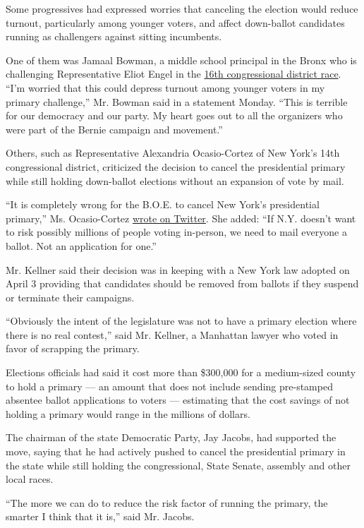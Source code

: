 Some progressives had expressed worries that canceling the election
would reduce turnout, particularly among younger voters, and affect
down-ballot candidates running as challengers against sitting
incumbents.

One of them was Jamaal Bowman, a middle school principal in the Bronx
who is challenging Representative Eliot Engel in the
\href{https://www.nytimes3xbfgragh.onion/2019/06/18/us/politics/jamaal-bowman-eliot-engel.html}{16th
congressional district race}. ``I'm worried that this could depress
turnout among younger voters in my primary challenge,'' Mr. Bowman said
in a statement Monday. ``This is terrible for our democracy and our
party. My heart goes out to all the organizers who were part of the
Bernie campaign and movement.''

Others, such as Representative Alexandria Ocasio-Cortez of New York's
14th congressional district, criticized the decision to cancel the
presidential primary while still holding down-ballot elections without
an expansion of vote by mail.

``It is completely wrong for the B.O.E. to cancel New York's
presidential primary,'' Ms. Ocasio-Cortez
\href{https://twitter.com/AOC/status/1254829322352893955}{wrote on
Twitter}. She added: ``If N.Y. doesn't want to risk possibly millions of
people voting in-person, we need to mail everyone a ballot. Not an
application for one.''

Mr. Kellner said their decision was in keeping with a New York law
adopted on April 3 providing that candidates should be removed from
ballots if they suspend or terminate their campaigns.

``Obviously the intent of the legislature was not to have a primary
election where there is no real contest,'' said Mr. Kellner, a Manhattan
lawyer who voted in favor of scrapping the primary.

Elections officials had said it cost more than \$300,000 for a
medium-sized county to hold a primary --- an amount that does not
include sending pre-stamped absentee ballot applications to voters ---
estimating that the cost savings of not holding a primary would range in
the millions of dollars.

The chairman of the state Democratic Party, Jay Jacobs, had supported
the move, saying that he had actively pushed to cancel the presidential
primary in the state while still holding the congressional, State
Senate, assembly and other local races.

``The more we can do to reduce the risk factor of running the primary,
the smarter I think that it is,'' said Mr. Jacobs.

